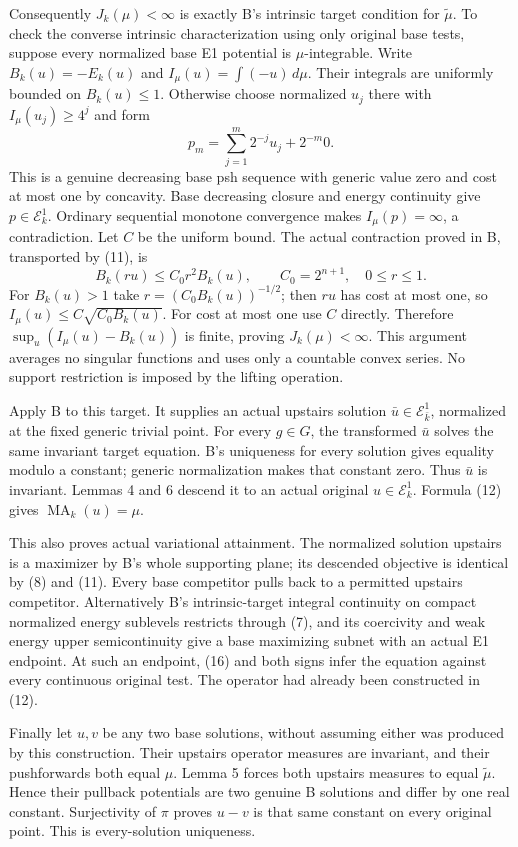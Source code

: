 \documentclass[
  11pt,
]{article}
\begin{document}
Consequently \(J_k(\mu)<\infty\) is exactly B's intrinsic target
condition for \(\widetilde\mu\). To check the converse intrinsic
characterization using only original base tests, suppose every
normalized base E1 potential is \(\mu\)-integrable. Write
\(B_k(u)=-E_k(u)\) and \(I_\mu(u)=\int(-u)\,d\mu\). Their integrals are
uniformly bounded on \(B_k(u)\leq1\). Otherwise choose normalized
\(u_j\) there with \(I_\mu(u_j)\geq4^j\) and form \[
 p_m=\sum_{j=1}^m2^{-j}u_j+2^{-m}0.
\] This is a genuine decreasing base psh sequence with generic value
zero and cost at most one by concavity. Base decreasing closure and
energy continuity give \(p\in\mathcal E^1_k\). Ordinary sequential
monotone convergence makes \(I_\mu(p)=\infty\), a contradiction. Let
\(C\) be the uniform bound. The actual contraction proved in B,
transported by (11), is \[
 B_k(ru)\leq C_0r^2B_k(u),\qquad C_0=2^{n+1},\quad0\leq r\leq1.
\] For \(B_k(u)>1\) take \(r=(C_0B_k(u))^{-1/2}\); then \(ru\) has cost
at most one, so \(I_\mu(u)\leq C\sqrt{C_0B_k(u)}\). For cost at most one
use \(C\) directly. Therefore \(\sup_u(I_\mu(u)-B_k(u))\) is finite,
proving \(J_k(\mu)<\infty\). This argument averages no singular
functions and uses only a countable convex series. No support
restriction is imposed by the lifting operation.

Apply B to this target. It supplies an actual upstairs solution
\(\bar u\in\mathcal E^1_{\bar k}\), normalized at the fixed generic
trivial point. For every \(g\in G\), the transformed \(\bar u\) solves
the same invariant target equation. B's uniqueness for every solution
gives equality modulo a constant; generic normalization makes that
constant zero. Thus \(\bar u\) is invariant. Lemmas 4 and 6 descend it
to an actual original \(u\in\mathcal E^1_k\). Formula (12) gives
\(\operatorname{MA}_k(u)=\mu\).

This also proves actual variational attainment. The normalized solution
upstairs is a maximizer by B's whole supporting plane; its descended
objective is identical by (8) and (11). Every base competitor pulls back
to a permitted upstairs competitor. Alternatively B's intrinsic-target
integral continuity on compact normalized energy sublevels restricts
through (7), and its coercivity and weak energy upper semicontinuity
give a base maximizing subnet with an actual E1 endpoint. At such an
endpoint, (16) and both signs infer the equation against every
continuous original test. The operator had already been constructed in
(12).

Finally let \(u,v\) be any two base solutions, without assuming either
was produced by this construction. Their upstairs operator measures are
invariant, and their pushforwards both equal \(\mu\). Lemma 5 forces
both upstairs measures to equal \(\widetilde\mu\). Hence their pullback
potentials are two genuine B solutions and differ by one real constant.
Surjectivity of \(\pi\) proves \(u-v\) is that same constant on every
original point. This is every-solution uniqueness.
\end{document}
